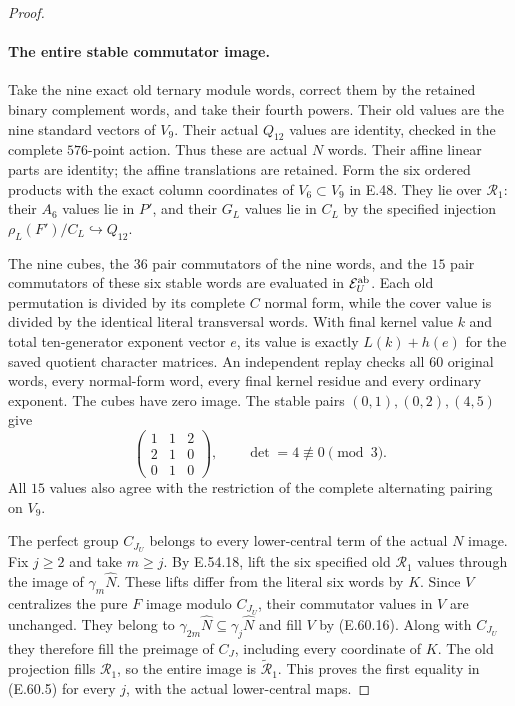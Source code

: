 \begin{proof}
\paragraph{The entire stable commutator image.}
Take the nine exact old ternary module words, correct
them by the retained binary complement words, and
take their fourth powers. Their old values are the
nine standard vectors of $V_9$. Their actual $Q_{12}$
values are identity, checked in the complete $576$-point
action. Thus these are actual $N$ words. Their affine
linear parts are identity; the affine translations are
retained. Form the six ordered products with the exact
column coordinates of $V_6\subset V_9$ in E.48.
They lie over $\mathcal R_1$: their $A_6$ values lie
in $P'$, and their $G_L$ values lie in $C_L$ by the
specified injection $\rho_L(F')/C_L\hookrightarrow Q_{12}$.

The nine cubes, the $36$ pair commutators of the nine
words, and the $15$ pair commutators of these six
stable words are evaluated in $\mathcal E_U^{\rm ab}$.
Each old permutation is divided by its complete
$C$ normal form, while the cover value is divided by
the identical literal transversal words. With final
kernel value $k$ and total ten-generator exponent
vector $e$, its value is exactly $L(k)+h(e)$ for the
saved quotient character matrices.
An independent replay checks all $60$ original words,
every normal-form word, every final kernel residue and
every ordinary exponent. The cubes have zero image.
The stable pairs $(0,1),(0,2),(4,5)$ give
\[
                 \begin{pmatrix}1&1&2\\2&1&0\\0&1&0\end{pmatrix},
             \qquad\det=4\not\equiv0\pmod3.
 \tag{E.60.16}
\]
All $15$ values also agree with the restriction of the
complete alternating pairing on $V_9$.

The perfect group $C_{J_U}$ belongs to every
lower-central term of the actual $N$ image.
Fix $j\ge2$ and take $m\ge j$. By E.54.18, lift the
six specified old $\mathcal R_1$ values through the
image of $\gamma_m\widehat N$.
These lifts differ from the literal six words by $K$.
Since $V$ centralizes the pure $F$ image modulo
$C_{J_U}$, their commutator values in $V$ are unchanged.
They belong to $\gamma_{2m}\widehat N\subseteq
\gamma_j\widehat N$ and fill $V$ by
\textup{(E.60.16)}. Along with $C_{J_U}$ they therefore
fill the preimage of $C_J$, including every coordinate
of $K$. The old projection fills $\mathcal R_1$, so
the entire image is $\widetilde{\mathcal R}_1$.
This proves the first equality in \textup{(E.60.5)}
for every $j$, with the actual lower-central maps.


\end{proof}
